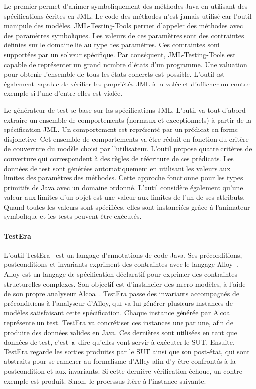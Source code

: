 Le premier permet d'animer symboliquement des méthodes Java en utilisant des
spécifications écrites en JML. Le code des méthodes n'est jamais utilisé car
l'outil manipule des modèles. JML-Testing-Tools permet d'appeler des méthodes
avec des paramètres symboliques. Les valeurs de ces paramètres sont des
contraintes définies sur le domaine lié au type des paramètres. Ces contraintes
sont supportées par un solveur spécifique. Par conséquent, JML-Testing-Tools est
capable de représenter un grand nombre d'états d'un programme. Une valuation
pour obtenir l'ensemble de tous les états concrets est possible. L'outil est
également capable de vérifier les propriétés JML à la volée et d'afficher un
contre-exemple si l'une d'entre elles est violée.

Le générateur de test se base sur les spécifications JML. L'outil va tout
d'abord extraire un ensemble de comportements (normaux et exceptionnels) à
partir de la spécification JML. Un comportement est représenté par un prédicat
en forme disjonctive. Cet ensemble de comportements va être réduit en fonction
du critère de couverture du modèle choisi par l'utilisateur. L'outil propose
quatre critères de couverture qui correspondent à des règles de réécriture de
ces prédicats. Les données de test sont générées automatiquement en utilisant
les valeurs aux limites des paramètres des méthodes. Cette approche fonctionne
pour les types primitifs de Java avec un domaine ordonné. L'outil considère
également qu'une valeur aux limites d'un objet est une valeur aux limites de
l'un de ses attributs. Quand toutes les valeurs sont spécifiées, elles sont
instanciées grâce à l'animateur symbolique et les tests peuvent être exécutés.

\paragraph{TestEra} L'outil TestEra~ est un langage
d'annotations de code Java. Ses préconditions, postconditions et invariants
expriment des contraintes avec le langage Alloy~. Alloy est un
langage de spécification déclaratif pour exprimer des contraintes structurelles
complexes. Son objectif est d'instancier des micro-modèles, à l'aide de son
propre analyseur Alcoa~. TestEra passe des invariants
accompagnés de préconditions à l'analyseur d'Alloy, qui va lui générer plusieurs
instances de modèles satisfaisant cette spécification. Chaque instance générée
par Alcoa représente un test. TestEra va concrétiser ces instances une par une,
afin de produire des données valides en Java. Ces dernières sont utilisées en
tant que données de test, c'est~à~dire qu'elles vont servir à exécuter le SUT.
Ensuite, TestEra regarde les sorties produites par le SUT ainsi que son
post-état, qui sont abstraits pour se ramener au formalisme d'Alloy afin d'y
être confrontés à la postcondition et aux invariants. Si cette dernière
vérification échoue, un contre-exemple est produit. Sinon, le processus itère à
l'instance suivante.

